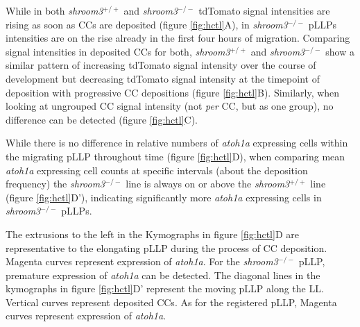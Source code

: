 \documentclass[11pt,singlespacinge,twoside]{reedthesis} %
\theoremstyle{definition}
\theoremstyle{definition}
\theoremstyle{definition}
\theoremstyle{remark}
\begin{document}
While in both \emph{shroom3}\(^{+/+}\) and \emph{shroom3}\(^{-/-}\) tdTomato signal intensities are rising as soon as CCs are deposited (figure \ref{fig:hctl}A), in \emph{shroom3}\(^{-/-}\) pLLPs intensities are on the rise already in the first four hours of migration. Comparing signal intensities in deposited CCs for both, \emph{shroom3}\(^{+/+}\) and \emph{shroom3}\(^{-/-}\) show a similar pattern of increasing tdTomato signal intensity over the course of development but decreasing tdTomato signal intensity at the timepoint of deposition with progressive CC depositions (figure \ref{fig:hctl}B). Similarly, when looking at ungrouped CC signal intensity (not \emph{per} CC, but as one group), no difference can be detected (figure \ref{fig:hctl}C).

While there is no difference in relative numbers of \emph{atoh1a} expressing cells within the migrating pLLP throughout time (figure \ref{fig:hctl}D), when comparing mean \emph{atoh1a} expressing cell counts at specific intervals (about the deposition frequency) the \emph{shroom3}\(^{-/-}\) line is always on or above the \emph{shroom3}\(^{+/+}\) line (figure \ref{fig:hctl}D'), indicating significantly more \emph{atoh1a} expressing cells in \emph{shroom3}\(^{-/-}\) pLLPs.

The extrusions to the left in the Kymographs in figure \ref{fig:hctl}D are representative to the elongating pLLP during the process of CC deposition. Magenta curves represent expression of \emph{atoh1a}. For the \emph{shroom3}\(^{-/-}\) pLLP, premature expression of \emph{atoh1a} can be detected. The diagonal lines in the kymographs in figure \ref{fig:hctl}D' represent the moving pLLP along the LL. Vertical curves represent deposited CCs. As for the registered pLLP, Magenta curves represent expression of \emph{atoh1a}.
\end{document}

